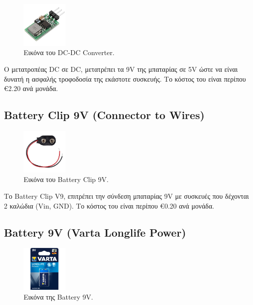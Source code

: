 \documentclass[conference]{IEEEtran}
\begin{document}
\begin{figure}[H]
	\centerline{\includegraphics[width=0.2\textwidth]{assets/dc2dc}}
	\caption{Εικόνα του DC-DC Converter.}
	\label{Εικόνα του DC-DC Converter.}
\end{figure}

Ο μετατροπέας DC σε DC, μετατρέπει τα 9V της μπαταρίας σε 5V ώστε να είναι δυνατή η ασφαλής τροφοδοσία της εκάστοτε συσκευής. Το κόστος του είναι περίπου €2.20 ανά μονάδα. \cite{dc2dc}

\subsection{Battery Clip 9V (Connector to Wires)}

\begin{figure}[H]
	\centerline{\includegraphics[width=0.2\textwidth]{assets/battery-clip}}
	\caption{Εικόνα του Battery Clip 9V.}
	\label{Εικόνα του Battery Clip 9V.}
\end{figure}

Το Battery Clip V9, επιτρέπει την σύνδεση μπαταρίας 9V με συσκευές που δέχονται 2 καλώδια (Vin, GND). Το κόστος του είναι περίπου €0.20 ανά μονάδα. \cite{bcv9}

\subsection{Battery 9V (Varta Longlife Power)}

\begin{figure}[H]
	\centerline{\includegraphics[width=0.2\textwidth]{assets/battery}}
	\caption{Εικόνα της Battery 9V.}
	\label{Εικόνα της Battery 9V.}
\end{figure}
\end{document}
